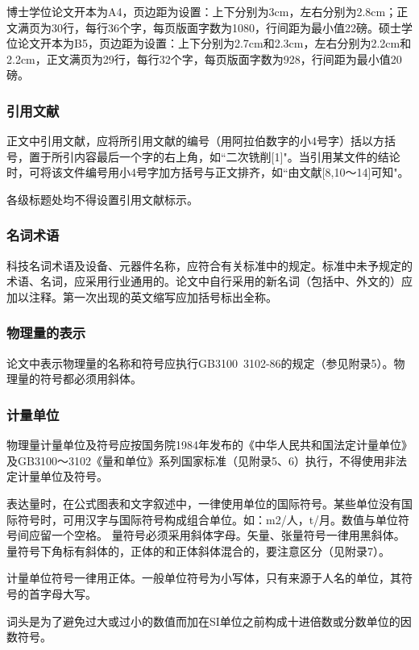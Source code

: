 博士学位论文开本为A4，页边距为设置：上下分别为3cm，左右分别为2.8cm；正文满页为30行，每行36个字，每页版面字数为1080，行间距为最小值22磅。硕士学位论文开本为B5，页边距为设置：上下分别为2.7cm和2.3cm，左右分别为2.2cm和2.2cm，正文满页为29行，每行32个字，每页版面字数为928，行间距为最小值20磅。

\subsubsection{引用文献}\label{appendixA-6-2-3}
正文中引用文献，应将所引用文献的编号（用阿拉伯数字的小4号字）括以方括号，置于所引内容最后一个字的右上角，如``二次铣削[1]"。当引用某文件的结论时，可将该文件编号用小4号字加方括号与正文排齐，如``由文献[8,10～14]可知"。

各级标题处均不得设置引用文献标示。

\subsubsection{名词术语}\label{appendixA-6-2-4}
科技名词术语及设备、元器件名称，应符合有关标准中的规定。标准中未予规定的术语、名词，应采用行业通用的。论文中自行采用的新名词（包括中、外文的）应加以注释。第一次出现的英文缩写应加括号标出全称。

\subsubsection{物理量的表示}\label{appendixA-6-2-5}
论文中表示物理量的名称和符号应执行GB3100~3102-86的规定（参见附录5）。物理量的符号都必须用斜体。

\subsubsection{计量单位}\label{appendixA-6-2-6}
物理量计量单位及符号应按国务院1984年发布的《中华人民共和国法定计量单位》及GB3100～3102《量和单位》系列国家标准（见附录5、6）执行，不得使用非法定计量单位及符号。

表达量时，在公式图表和文字叙述中，一律使用单位的国际符号。某些单位没有国际符号时，可用汉字与国际符号构成组合单位。如：m2/人，t/月。数值与单位符号间应留一个空格。
量符号必须采用斜体字母。矢量、张量符号一律用黑斜体。量符号下角标有斜体的，正体的和正体斜体混合的，要注意区分（见附录7）。

计量单位符号一律用正体。一般单位符号为小写体，只有来源于人名的单位，其符号的首字母大写。

词头是为了避免过大或过小的数值而加在SI单位之前构成十进倍数或分数单位的因数符号。

